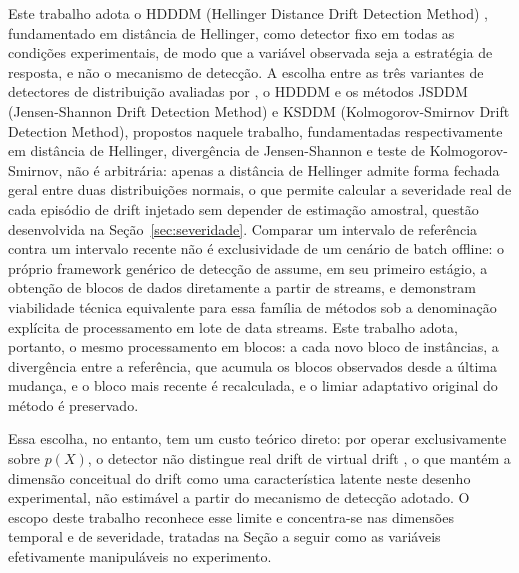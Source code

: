 Este trabalho adota o HDDDM (Hellinger Distance Drift Detection Method)
\cite{ditzler2011}, fundamentado em distância de
Hellinger, como detector fixo em todas as condições experimentais, de modo
que a variável observada seja a estratégia de resposta, e não o mecanismo de
detecção.
A escolha entre as três variantes de detectores de distribuição avaliadas por
, o HDDDM e os métodos JSDDM (Jensen-Shannon Drift
Detection Method) e KSDDM (Kolmogorov-Smirnov Drift Detection Method),
propostos naquele trabalho,
fundamentadas respectivamente
em distância de Hellinger, divergência de Jensen-Shannon e teste de
Kolmogorov-Smirnov, não é arbitrária: apenas a distância de Hellinger admite
forma fechada geral entre duas distribuições normais, o que permite calcular
a severidade real de cada episódio de drift injetado sem depender de
estimação amostral, questão desenvolvida na Seção~\ref{sec:severidade}.
Comparar um intervalo de referência contra um intervalo recente não é
exclusividade de um cenário de batch offline: o próprio framework genérico de
detecção de  assume, em seu primeiro estágio, a obtenção de
blocos de dados diretamente a partir de streams, e 
demonstram viabilidade técnica equivalente para essa família de métodos sob a
denominação explícita de processamento em lote de data streams. Este trabalho
adota, portanto, o mesmo processamento em blocos: a cada novo bloco de
instâncias, a divergência entre a referência, que acumula os blocos
observados desde a última mudança, e o bloco mais recente é recalculada, e o
limiar adaptativo original do método é preservado.

Essa escolha, no entanto, tem um custo teórico direto: por operar
exclusivamente sobre $p(X)$, o detector não distingue real drift de virtual
drift \cite{gama2014}, o que mantém a dimensão conceitual do drift como uma
característica latente neste desenho experimental, não estimável a partir do
mecanismo de detecção adotado. O escopo deste trabalho reconhece esse limite
e concentra-se nas dimensões temporal e de severidade, tratadas na Seção a
seguir como as variáveis efetivamente manipuláveis no experimento.

